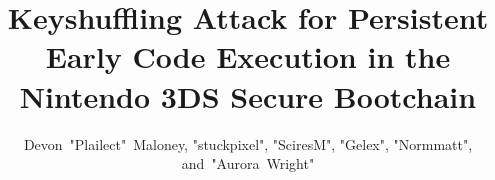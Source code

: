 \documentclass[journal]{IEEEtran}
\begin{document}
%
\title{Keyshuffling Attack for Persistent Early Code Execution in the Nintendo
3DS Secure Bootchain}
%
%
%

\author{Devon~"Plailect"~Maloney, "stuckpixel", "SciresM", "Gelex", "Normmatt", and~"Aurora~Wright"\vspace{-2.0em}}

% 
%

\maketitle
\end{document}

